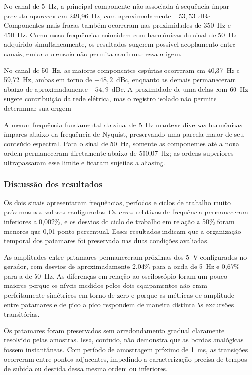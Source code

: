 \documentclass[a4paper,12pt]{fcte}
\begin{document}
No canal de 5~Hz, a principal componente não associada à sequência ímpar prevista apareceu em 249,96~Hz, com aproximadamente $-53,53$~dBc. Componentes mais fracas também ocorreram nas proximidades de 350~Hz e 450~Hz. Como essas frequências coincidem com harmônicas do sinal de 50~Hz adquirido simultaneamente, os resultados sugerem possível acoplamento entre canais, embora o ensaio não permita confirmar essa origem.

No canal de 50~Hz, as maiores componentes espúrias ocorreram em 40,37~Hz e 59,72~Hz, ambas em torno de $-48,2$~dBc, enquanto as demais permaneceram abaixo de aproximadamente $-54,9$~dBc. A proximidade de uma delas com 60~Hz sugere contribuição da rede elétrica, mas o registro isolado não permite determinar sua origem.

A menor frequência fundamental do sinal de 5~Hz manteve diversas harmônicas ímpares abaixo da frequência de Nyquist, preservando uma parcela maior de seu conteúdo espectral. Para o sinal de 50~Hz, somente as componentes até a nona ordem permaneceram diretamente abaixo de 500,07~Hz; as ordens superiores ultrapassaram esse limite e ficaram sujeitas a aliasing.

\subsubsection{Discussão dos resultados}
\label{subsubsec:discussao_quadradas}

Os dois sinais apresentaram frequências, períodos e ciclos de trabalho muito próximos aos valores configurados. Os erros relativos de frequência permaneceram inferiores a 0,002\%, e os desvios do ciclo de trabalho em relação a 50\% foram menores que 0,01 ponto percentual. Esses resultados indicam que a organização temporal dos patamares foi preservada nas duas condições avaliadas.

As amplitudes entre patamares permaneceram próximas dos 5~V configurados no gerador, com desvios de aproximadamente 2,04\% para a onda de 5~Hz e 0,67\% para a de 50~Hz. As diferenças em relação ao osciloscópio foram um pouco maiores porque os níveis medidos pelos dois equipamentos não eram perfeitamente simétricos em torno de zero e porque as métricas de amplitude entre patamares e de pico a pico respondem de maneira distinta às excursões transitórias.

Os patamares foram preservados sem arredondamento gradual claramente resolvido pelas amostras. Isso, contudo, não demonstra que as bordas analógicas fossem instantâneas. Com período de amostragem próximo de 1~ms, as transições ocorreram entre pontos adjacentes, impedindo a caracterização precisa de tempos de subida ou descida dessa mesma ordem ou inferiores.
\end{document}
